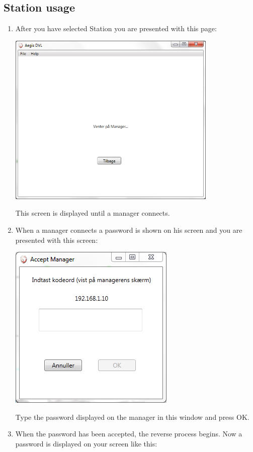 \documentclass[a4paper]{report}
\begin{document}
\subsection*{Station usage}
\begin{enumerate}
\item After you have selected Station you are presented with this page: \\
\begin{center}
\includegraphics[width=100mm]{WaitingForManager.png}
\end{center}
This screen is displayed until a manager connects.
\item When a manager connects a password is shown on his screen and you are presented with this screen: \\
\begin{center}
\includegraphics{AcceptManagerDialog.png}
\end{center}
Type the password displayed on the manager in this window and press OK.
\item When the password has been accepted, the reverse process begins. Now a password is displayed on your screen like this: \\

\end{enumerate}
\end{document}

